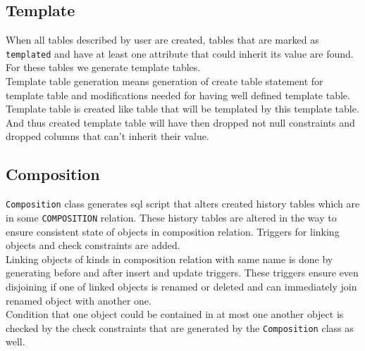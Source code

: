 \documentclass[deska]{subfiles}
\begin{document}
\subsection{Template}
When all tables described by user are created, tables that are marked as {\tt templated} and have at least one attribute that could inherit its value are found. For these tables we generate template tables.\\
Template table generation means generation of create table statement for template table and modifications needed for having well defined template table.
Template table is created like table that will be templated by this template table. And thus created template table will have then dropped not null constraints and dropped columns that can't inherit their value.

\subsection{Composition}
{\tt Composition} class generates sql script that alters created history tables which are in some {\tt COMPOSITION} relation. These history tables are altered in the way to ensure consistent state of objects in composition relation. Triggers for linking objects and check constraints are added.\\
Linking objects of kinds in composition relation with same name is done by generating before and after insert and update triggers. These triggers ensure even disjoining if one of linked objects is renamed or deleted and can immediately join renamed object with another one.\\
Condition that one object could be contained in at most one another object is checked by the check constraints that are generated by the {\tt Composition} class as well.
\end{document}

